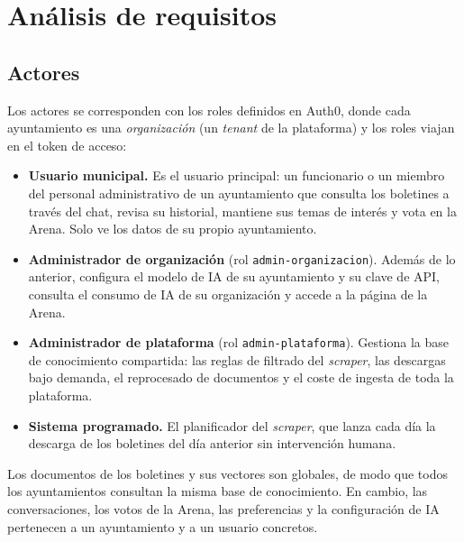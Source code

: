 \chapter{Análisis de requisitos}
\label{cap:requisitos}

\section{Actores}
\label{sec:actores}

Los actores se corresponden con los roles definidos en Auth0, donde cada ayuntamiento es una \emph{organización} (un \emph{tenant} de la plataforma) y los roles viajan en el token de acceso:

\begin{itemize}
  \item \textbf{Usuario municipal.} Es el usuario principal: un funcionario o un miembro del personal administrativo de un ayuntamiento que consulta los boletines a través del chat, revisa su historial, mantiene sus temas de interés y vota en la Arena. Solo ve los datos de su propio ayuntamiento.
  \item \textbf{Administrador de organización} (rol \texttt{admin-organizacion}). Además de lo anterior, configura el modelo de IA de su ayuntamiento y su clave de API, consulta el consumo de IA de su organización y accede a la página de la Arena.
  \item \textbf{Administrador de plataforma} (rol \texttt{admin-plataforma}). Gestiona la base de conocimiento compartida: las reglas de filtrado del \emph{scraper}, las descargas bajo demanda, el reprocesado de documentos y el coste de ingesta de toda la plataforma.
  \item \textbf{Sistema programado.} El planificador del \emph{scraper}, que lanza cada día la descarga de los boletines del día anterior sin intervención humana.
\end{itemize}

Los documentos de los boletines y sus vectores son globales, de modo que todos los ayuntamientos consultan la misma base de conocimiento. En cambio, las conversaciones, los votos de la Arena, las preferencias y la configuración de IA pertenecen a un ayuntamiento y a un usuario concretos.

